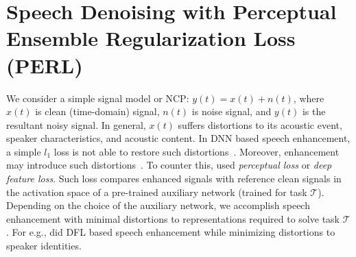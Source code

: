 \documentclass{article}
\begin{document}
\section{Speech Denoising with Perceptual Ensemble Regularization Loss (PERL)}
\label{sec:perl}
We consider a simple signal model or \ac{NCP}: $y(t) = x(t) + n(t)$, where $x(t)$ is clean (time-domain) signal, $n(t)$ is noise signal, and $y(t)$ is the resultant noisy signal.
In general, $x(t)$ suffers distortions to its acoustic event, speaker characteristics, and acoustic content.
In \ac{DNN} based speech enhancement, a simple $l_1$ loss is not able to restore such distortions~\cite{kataria2020analysis}.
Moreover, enhancement may introduce such distortions~\cite{kataria2020analysis}.
To counter this, \cite{germain2018speech,kataria2020analysis} used \emph{perceptual loss} or \emph{deep feature loss}.
Such loss compares enhanced signals with reference clean signals in the activation space of a pre-trained auxiliary network (trained for task $\mathcal{T}$).
Depending on the choice of the auxiliary network, we accomplish speech enhancement with minimal distortions to representations required to solve task $\mathcal{T}$.
For e.g., \cite{kataria2020analysis} did \ac{DFL} based speech enhancement while minimizing distortions to speaker identities.
\end{document}
